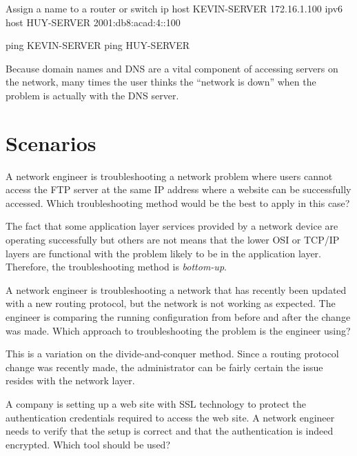 \begin{sexylisting}{Assign a name to a router or switch}
ip host KEVIN-SERVER 172.16.1.100
ipv6 host HUY-SERVER 2001:db8:acad:4::100

ping KEVIN-SERVER
ping HUY-SERVER
\end{sexylisting}

Because domain names and DNS are a vital component of accessing servers on the network, many times the user thinks the “network is down” when the problem is actually with the DNS server.

\section{Scenarios}

\begin{example}
A network engineer is troubleshooting a network problem where users cannot access the FTP server at the same IP address where a website can be successfully accessed. Which troubleshooting method would be the best to apply in this case? 
\end{example}

\begin{solution}
The fact that some application layer services provided by a network device are operating successfully but others are not means that the lower OSI or TCP/IP layers are functional with the problem likely to be in the application layer. Therefore, the troubleshooting method is \emph{bottom-up}.
\end{solution}

\begin{example}
A network engineer is troubleshooting a network that has recently been updated with a new routing protocol, but the network is not working as expected. The engineer is comparing the running configuration from before and after the change was made. Which approach to troubleshooting the problem is the engineer using? 
\end{example}

\begin{solution}
This is a variation on the divide-and-conquer method. Since a routing protocol change was recently made, the administrator can be fairly certain the issue resides with the network layer.
\end{solution}

\begin{example}
A company is setting up a web site with SSL technology to protect the authentication credentials required to access the web site. A network engineer needs to verify that the setup is correct and that the authentication is indeed encrypted. Which tool should be used?
\end{example}

